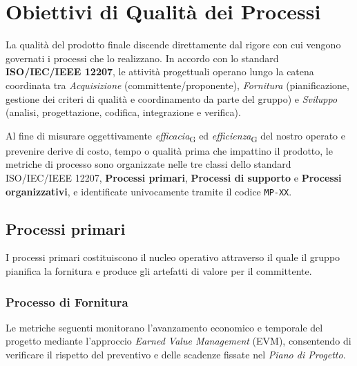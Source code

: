 \documentclass[11pt, a4paper]{article}
\newcommand{\glossario}[1]{\textit{#1}\textsubscript{G}}
\newcommand{\req}[1]{\texttt{#1}}
\begin{document}
\section{Obiettivi di Qualità dei Processi}

La qualità del prodotto finale discende direttamente dal rigore con cui vengono governati i processi che lo realizzano. In accordo con lo standard \textbf{ISO/IEC/IEEE 12207}, le attività progettuali operano lungo la catena coordinata tra \textit{Acquisizione} (committente/proponente), \textit{Fornitura} (pianificazione, gestione dei criteri di qualità e coordinamento da parte del gruppo) e \textit{Sviluppo} (analisi, progettazione, codifica, integrazione e verifica).

Al fine di misurare oggettivamente \glossario{efficacia} ed \glossario{efficienza} del nostro operato e prevenire derive di costo, tempo o qualità prima che impattino il prodotto, le metriche di processo sono organizzate nelle tre classi dello standard ISO/IEC/IEEE 12207, \textbf{Processi primari}, \textbf{Processi di supporto} e \textbf{Processi organizzativi}, e identificate univocamente tramite il codice \req{MP-XX}.

\subsection{Processi primari}
I processi primari costituiscono il nucleo operativo attraverso il quale il gruppo pianifica la fornitura e produce gli artefatti di valore per il committente.

\subsubsection{Processo di Fornitura}
Le metriche seguenti monitorano l'avanzamento economico e temporale del progetto mediante l'approccio \textit{Earned Value Management} (EVM), consentendo di verificare il rispetto del preventivo e delle scadenze fissate nel \textit{Piano di Progetto}.
\end{document}
